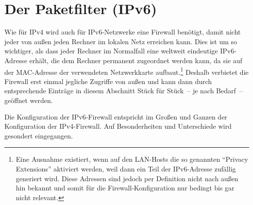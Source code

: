 \section{Der Paketfilter (IPv6)}

Wie für IPv4 wird auch für IPv6-Netzwerke eine Firewall benötigt, damit nicht
jeder von außen jeden Rechner im lokalen Netz erreichen kann. Dies ist um so
wichtiger, als dass jeder Rechner im Normalfall eine weltweit eindeutige
IPv6-Adresse erhält, die dem Rechner permanent zugeordnet werden kann, da sie
auf der MAC-Adresse der verwendeten Netzwerkkarte aufbaut.\footnote{Eine
Ausnahme existiert, wenn auf den LAN-Hosts die so genannten ``Privacy
Extensions'' aktiviert werden, weil dann ein Teil der IPv6-Adresse zufällig
generiert wird. Diese Adressen sind jedoch per Definition nicht nach außen hin
bekannt und somit für die Firewall-Konfiguration nur bedingt bis gar nicht
relevant.} Deshalb verbietet die Firewall erst einmal jegliche Zugriffe von
außen und kann dann durch entsprechende Einträge in diesem Abschnitt Stück für
Stück~-- je nach Bedarf~-- geöffnet werden.

Die Konfiguration der IPv6-Firewall entspricht im Großen und Ganzen der
Konfiguration der IPv4-Firewall. Auf Besonderheiten und Unterschiede wird
gesondert eingegangen.

